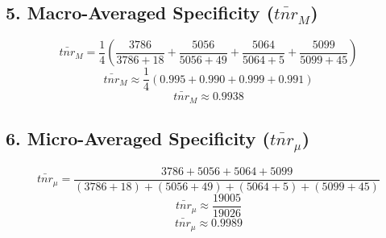 \documentclass{article}
\begin{document}
\subsection*{5. Macro-Averaged Specificity (\( \bar{tnr}_M \))}
\[
\bar{tnr}_M = \frac{1}{4} \left( \frac{3786}{3786 + 18} + \frac{5056}{5056 + 49} + \frac{5064}{5064 + 5} + \frac{5099}{5099 + 45} \right)
\]
\[ \bar{tnr}_M \approx \frac{1}{4} \left( 0.995 + 0.990 + 0.999 + 0.991 \right) \]
\[ \bar{tnr}_M \approx 0.9938 \]


\subsection*{6. Micro-Averaged Specificity (\( \bar{tnr}_\mu \))}
\[
\bar{tnr}_\mu = \frac{3786 + 5056 + 5064 + 5099}{(3786 + 18) + (5056 + 49) + (5064 + 5) + (5099 + 45)}
\]
\[ \bar{tnr}_\mu \approx \frac{19005}{19026} \]
\[ \bar{tnr}_\mu \approx 0.9989 \]
\end{document}
